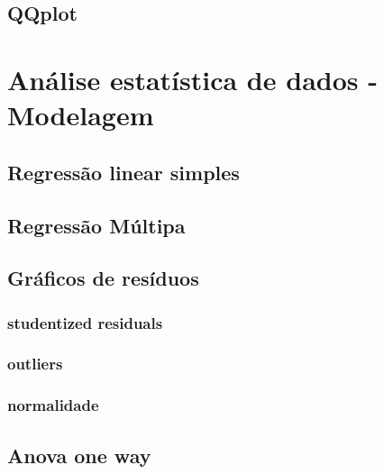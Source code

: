 \documentclass[
]{book}
\begin{document}
\hypertarget{qqplot}{%
\subsection{QQplot}\label{qqplot}}

\hypertarget{anuxe1lise-estatuxedstica-de-dados---modelagem}{%
\section{Análise estatística de dados - Modelagem}\label{anuxe1lise-estatuxedstica-de-dados---modelagem}}

\hypertarget{regressuxe3o-linear-simples}{%
\subsection{Regressão linear simples}\label{regressuxe3o-linear-simples}}

\hypertarget{regressuxe3o-muxfaltipa}{%
\subsection{Regressão Múltipa}\label{regressuxe3o-muxfaltipa}}

\hypertarget{gruxe1ficos-de-resuxedduos}{%
\subsection{Gráficos de resíduos}\label{gruxe1ficos-de-resuxedduos}}

\hypertarget{studentized-residuals}{%
\subsubsection{studentized residuals}\label{studentized-residuals}}

\hypertarget{outliers}{%
\subsubsection{outliers}\label{outliers}}

\hypertarget{normalidade}{%
\subsubsection{normalidade}\label{normalidade}}

\hypertarget{anova-one-way}{%
\subsection{Anova one way}\label{anova-one-way}}
\end{document}
